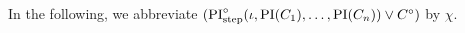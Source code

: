 \documentclass[,%
	draft=false,%
	numbers=noendperiod
	12pt,
	a4paper,
	oneside,%
	openany,
]{memoir}
\newcommand{\inv}{\ensuremath{\chi}}
\begin{document}
\begin{comment}
			Additionally, either this variable is $u$ or it is some variable $v$ such that $v\sigma_i$ contains a grey $u$.

		\item
			\label{14_4}
			$u$ occurs at a grey position in a grey literal.

	\end{enumerate}
	\noindent
	Subproof:
	Suppose the lemma precondition. we consider the formation cases for this:
	\begin{itemize}
		\item $u$ occurs grey in a $\Phi$-literal in $\inv\sigmazi$ and this fact is not changed by $\sigma_i$.
			Then we clearly have \ref{14_1}.

		\item Some $\Phi$-literal $\lambda$ in $\inv\sigmazmi$ contains a variable $v$ at a grey position such that $v\sigma_i$ contains a grey occ of $u$. 
			We distinguish further based on the position $p$ in the literal where $v$ and $u$ face each other.

			\begin{itemize}
				\item Suppose $p$ is in a s.c.\ $\Phi$-term. Then we have \ref{14_3} on $v$.
				\item Suppose $p$ is in a s.c.\ $\Psi$-term. Then we have \ref{14_3} on $u$.
				\item Suppose the res/fac lit is $\Psi$-colored, and the position is grey. Then we have \ref{14_2} on $v$.
				\item Suppose the res/fac lit is $\Phi$-colored, and the position is grey. Then we have \ref{14_1}
				\item Suppose the res/fac lit is grey, and the position is grey. Then we have \ref{14_4}

			\end{itemize}


	\end{itemize}

\end{comment}



In the following, we abbreviate $(\operatorname{PI}^\circ_{\mathrm{step}}(\iota, \operatorname{PI}(C_1), \dots, \operatorname{PI}(C_n)) \lor C^\circ)$ by $\inv$.
\end{document}
